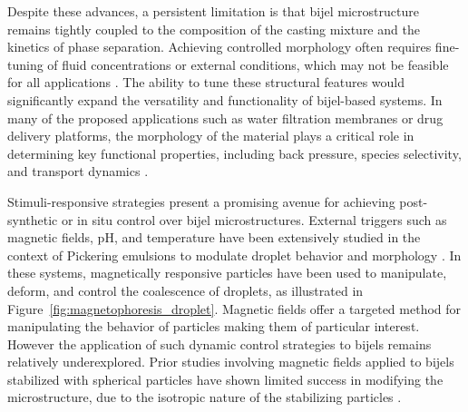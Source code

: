
Despite these advances, a persistent limitation is that bijel microstructure remains tightly coupled to the composition of the casting mixture and the kinetics of phase separation. Achieving controlled 
morphology often requires fine-tuning of fluid concentrations or external conditions, which may not be feasible for all applications \cite{haase_continuous_2015, reeves_particle-size_2015}.
The ability to tune these structural features would significantly expand the versatility and functionality of bijel-based systems.
In many of the proposed applications such as water filtration membranes or drug delivery 
platforms, the morphology of the material plays a critical role in determining key functional properties, including back pressure, species selectivity, and transport dynamics
\cite{vanoli_bijels_2022, thorson_bijel-templated_2019, khan_nanostructured_2022}.

Stimuli-responsive strategies present a promising avenue for achieving post-synthetic or in situ control over bijel microstructures. External triggers such as magnetic fields, pH, and temperature have 
been extensively studied in the context of Pickering emulsions to modulate droplet behavior and morphology \cite{tham_magnetophoresis_2021, cui_stabilizing_2013}. In these systems, magnetically 
responsive particles have been used to manipulate, deform, and control the coalescence of droplets, as illustrated in Figure~\ref{fig:magnetophoresis_droplet}. Magnetic 
fields offer a targeted method for manipulating the behavior of particles making them of particular interest. 
However the application of such dynamic control strategies to bijels remains relatively underexplored. Prior studies involving magnetic fields applied to bijels stabilized with spherical particles 
have shown limited success in modifying the microstructure, due to the isotropic nature of the stabilizing particles \cite{kim_bijels_2010}. 

